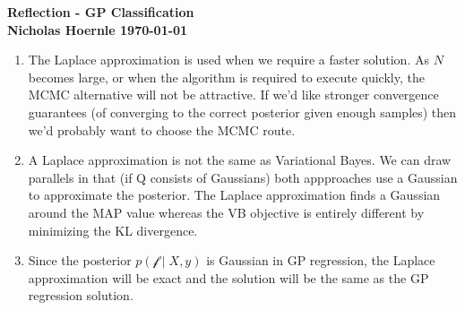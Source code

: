 \documentclass[twoside]{article}
\begin{document}
\textbf{Reflection - GP Classification}\\
\textbf{Nicholas Hoernle \hfill \today}

\begin{enumerate}
\item The Laplace approximation is used when we require a faster solution. As $N$ becomes large, or when the algorithm is required to execute quickly, the MCMC alternative will not be attractive. If we'd like stronger convergence guarantees (of converging to the correct posterior given enough samples) then we'd probably want to choose the MCMC route.
\item A Laplace approximation is not the same as Variational Bayes. We can draw parallels in that (if Q consists of Gaussians) both appproaches use a Gaussian to approximate the posterior. The Laplace approximation finds a Gaussian around the MAP value whereas the VB objective is entirely different by minimizing the KL divergence.
\item Since the posterior $p(\mathcal{f} \mid X, y)$ is Gaussian in GP regression, the Laplace approximation will be exact and the solution will be the same as the GP regression solution.
\end{enumerate}
\end{document}
